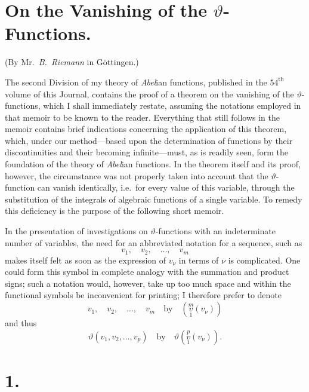 \documentclass{article}
\begin{document}
\section*{On the Vanishing of the $\vartheta$-Functions.}

(By Mr.~\emph{B.~Riemann} in Göttingen.)

The second Division of my theory of \emph{Abel}ian functions, published in the $54^{\text{th}}$ volume of this Journal, contains the proof of a theorem on the vanishing of the $\vartheta$-functions, which I shall immediately restate, assuming the notations employed in that memoir to be known to the reader. Everything that still follows in the memoir contains brief indications concerning the application of this theorem, which, under our method—based upon the determination of functions by their discontinuities and their becoming infinite—must, as is readily seen, form the foundation of the theory of \emph{Abel}ian functions. In the theorem itself and its proof, however, the circumstance was not properly taken into account that the $\vartheta$-function can vanish identically, i.e.\ for every value of this variable, through the substitution of the integrals of algebraic functions of a single variable. To remedy this deficiency is the purpose of the following short memoir.

In the presentation of investigations on $\vartheta$-functions with an indeterminate number of variables, the need for an abbreviated notation for a sequence, such as
\[
v_1,\quad v_2,\quad \dots,\quad v_m
\]
makes itself felt as soon as the expression of $v_\nu$ in terms of $\nu$ is complicated. One could form this symbol in complete analogy with the summation and product signs; such a notation would, however, take up too much space and within the functional symbols be inconvenient for printing; I therefore prefer to denote
\[
v_1,\quad v_2,\quad \dots,\quad v_m \quad\text{by}\quad \left(\overset{m}{\underset{1}{v}}(v_\nu)\right)
\]
and thus
\[
\vartheta(v_1, v_2, \dots, v_p) \quad\text{by}\quad \vartheta\left(\overset{p}{\underset{1}{v}}(v_\nu)\right).
\]

\section*{1.}
\end{document}
